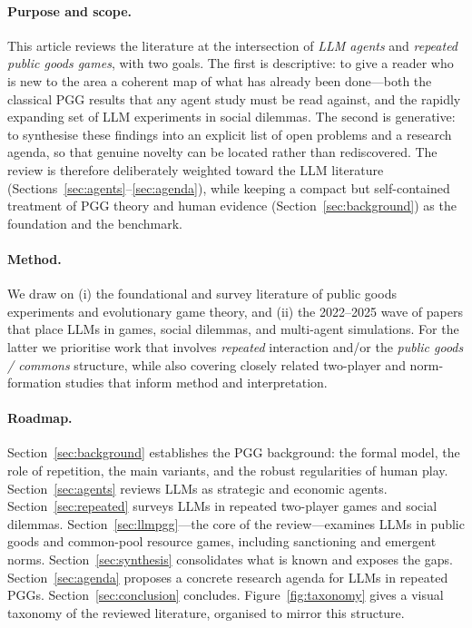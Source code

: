 \documentclass[11pt,a4paper]{article}
\begin{document}
\paragraph{Purpose and scope.}
This article reviews the literature at the intersection of \emph{LLM agents} and
\emph{repeated public goods games}, with two goals. The first is descriptive: to
give a reader who is new to the area a coherent map of what has already been
done---both the classical PGG results that any agent study must be read against,
and the rapidly expanding set of LLM experiments in social dilemmas. The second
is generative: to synthesise these findings into an explicit list of open
problems and a research agenda, so that genuine novelty can be located rather
than rediscovered. The review is therefore deliberately weighted toward the LLM
literature (Sections~\ref{sec:agents}--\ref{sec:agenda}), while keeping a compact
but self-contained treatment of PGG theory and human evidence
(Section~\ref{sec:background}) as the foundation and the benchmark.

\paragraph{Method.}
We draw on (i) the foundational and survey literature of public goods experiments
and evolutionary game theory, and (ii) the 2022--2025 wave of papers that place
LLMs in games, social dilemmas, and multi-agent simulations. For the latter we
prioritise work that involves \emph{repeated} interaction and/or the \emph{public
goods / commons} structure, while also covering closely related two-player and
norm-formation studies that inform method and interpretation.

\paragraph{Roadmap.}
Section~\ref{sec:background} establishes the PGG background: the formal model, the
role of repetition, the main variants, and the robust regularities of human play.
Section~\ref{sec:agents} reviews LLMs as strategic and economic agents.
Section~\ref{sec:repeated} surveys LLMs in repeated two-player games and social
dilemmas. Section~\ref{sec:llmpgg}---the core of the review---examines LLMs in
public goods and common-pool resource games, including sanctioning and emergent
norms. Section~\ref{sec:synthesis} consolidates what is known and exposes the
gaps. Section~\ref{sec:agenda} proposes a concrete research agenda for LLMs in
repeated PGGs. Section~\ref{sec:conclusion} concludes.
Figure~\ref{fig:taxonomy} gives a visual taxonomy of the reviewed literature,
organised to mirror this structure.
\end{document}
